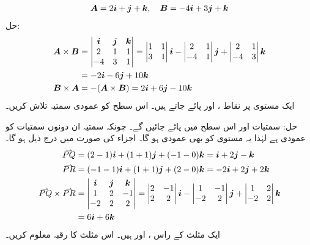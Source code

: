 \begin{align*}
{\ensuremath{{\boldsymbol{A}}}}=2{\boldsymbol{i}}+{\boldsymbol{j}}+{\boldsymbol{k}},\quad {\ensuremath{{\boldsymbol{B}}}}=-4{\boldsymbol{i}}+3{\boldsymbol{j}}+{\boldsymbol{k}}
\end{align*}
حل:
\begin{align*}
{\ensuremath{{\boldsymbol{A}}}}\times{\ensuremath{{\boldsymbol{B}}}}&=
\begin{vmatrix}
{\boldsymbol{i}}&{\boldsymbol{j}}&{\boldsymbol{k}}\\
2&1&1\\
-4&3&1
\end{vmatrix}=
\begin{vmatrix} 1&1\\ 3&1 \end{vmatrix}{\boldsymbol{i}}-\begin{vmatrix}2&1\\-4&1  \end{vmatrix}{\boldsymbol{j}}+\begin{vmatrix}2&1\\-4&3  \end{vmatrix}{\boldsymbol{k}}\\
&=-2{\boldsymbol{i}}-6{\boldsymbol{j}}+10{\boldsymbol{k}}\\
{{\boldsymbol{B}}}\times{\ensuremath{{\boldsymbol{A}}}}&=-({{\boldsymbol{A}}}\times{\ensuremath{{\boldsymbol{B}}}})=2{\boldsymbol{i}}+6{\boldsymbol{j}}-10{\boldsymbol{k}}
\end{align*}
ایک مستوی پر نقاط ،  اور  پائے جاتے ہیں۔ اس سطح کو عمودی سمتیہ تلاش کریں۔

حل:\quad
سمتیات  اور  اس سطح میں پائے جائیں گے۔ چونکہ سمتیہ  ان دونوں سمتیات کو عمودی ہے لہٰذا یہ مستوی کو بھی عمودی ہو گا۔ اجزاء کی صورت میں درج ذیل ہو گا۔
\begin{align*}
\krightharpoonup{PQ}&=(2-1)\ai+(1+1)\aj+(-1-0)\ak=\ai+2\aj-\ak\\
\krightharpoonup{PR}&=(-1-1)\ai+(1+1)\aj+(2-0)\ak=-2\ai+2\aj+2\ak\\
\krightharpoonup{PQ}\times\krightharpoonup{PR}&=
\begin{vmatrix}
\ai&\aj&\ak\\
1&2&-1\\
-2&2&2
\end{vmatrix}=
\begin{vmatrix}2&-1\\2&2  \end{vmatrix}\ai-\begin{vmatrix} 1&-1\\-2&2 \end{vmatrix}\aj+\begin{vmatrix}1&2\\-2&2  \end{vmatrix}\ak\\
&=6\ai+6\ak
\end{align*}
ایک مثلث کے راس ،  اور  ہیں۔ اس مثلث کا رقبہ معلوم کریں۔

